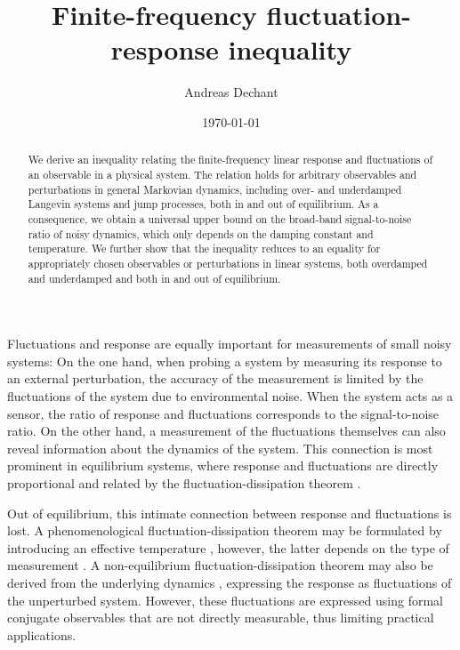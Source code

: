 \documentclass[aps,pre,twocolumn,superscriptaddress,notitlepage]{revtex4-2}
\begin{document}
\author{Andreas Dechant}
\title{Finite-frequency fluctuation-response inequality}
\date{\today}

\begin{abstract}
We derive an inequality relating the finite-frequency linear response and fluctuations of an observable in a physical system.
The relation holds for arbitrary observables and perturbations in general Markovian dynamics, including over- and underdamped Langevin systems and jump processes, both in and out of equilibrium.
As a consequence, we obtain a universal upper bound on the broad-band signal-to-noise ratio of noisy dynamics, which only depends on the damping constant and temperature.
We further show that the inequality reduces to an equality for appropriately chosen observables or perturbations in linear systems, both overdamped and underdamped and both in and out of equilibrium.
\end{abstract}

\maketitle

Fluctuations and response are equally important for measurements of small noisy systems:
On the one hand, when probing a system by measuring its response to an external perturbation, the accuracy of the measurement is limited by the fluctuations of the system due to environmental noise.
When the system acts as a sensor, the ratio of response and fluctuations corresponds to the signal-to-noise ratio.
On the other hand, a measurement of the fluctuations themselves can also reveal information about the dynamics of the system.
This connection is most prominent in equilibrium systems, where response and fluctuations are directly proportional and related by the fluctuation-dissipation theorem \cite{Kubo1966,Kubo2012}.

Out of equilibrium, this intimate connection between response and fluctuations is lost.
A phenomenological fluctuation-dissipation theorem may be formulated by introducing an effective temperature \cite{Cugliandolo1997,Loi2008,Cugliandolo2011,Szamel2014,Lippiello2014}, however, the latter depends on the type of measurement \cite{Fielding2002}.
A non-equilibrium fluctuation-dissipation theorem may also be derived from the underlying dynamics \cite{Agarwal1972,Haenggi1982a,Marconi2008,Baiesi2009,Seifert2010a}, expressing the response as fluctuations of the unperturbed system.
However, these fluctuations are expressed using formal conjugate observables that are not directly measurable, thus limiting practical applications.
\end{document}
